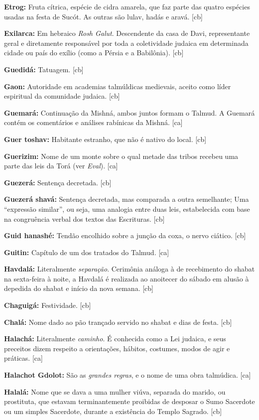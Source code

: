 \textbf{Etrog:} Fruta cítrica, espécie de cidra amarela, que faz parte das 
quatro espécies usadas na festa de Sucót. As outras são lulav, hadás e aravá. [cb]

\textbf{Exilarca:} Em hebraico \emph{Rosh Galut}. Descendente da casa de Davi, 
representante geral e diretamente responsável por toda a coletividade
judaica em determinada cidade ou país do exílio (como a Pérsia e a Babilônia). [cb]

\textbf{Guedidá:} Tatuagem. [cb]

\textbf{Gaon:} Autoridade em academias talmúldicas medievais, aceito como líder espiritual da comunidade judaica. [cb]

\textbf{Guemará:} Continuação da Mishná, ambos juntos formam o Talmud. A Guemará 
contém os comentários e análises rabínicas da Mishná. [ca]

\textbf{Guer toshav:} Habitante estranho, que não é nativo do local. [cb]

\textbf{Guerizim:} Nome de um monte sobre o qual metade das tribos recebeu uma 
parte das leis da Torá (ver \emph{Eval}). [ca]

\textbf{Guezerá:} Sentença decretada. [cb]

\textbf{Guezerá shavá:} Sentença decretada, mas comparada a outra semelhante; Uma ``expressão similar'', ou seja, uma analogia entre duas leis,
  estabelecida com base na congruência verbal dos textos das
  Escrituras. [cb]

\textbf{Guid hanashé:} Tendão encolhido sobre a junção da coxa, o nervo ciático. [cb]

\textbf{Guitin:} Capítulo de um dos tratados do Talmud. [ca]

\textbf{Havdalá:} Literalmente \emph{separação}. Cerimônia análoga à 
de recebimento do shabat na sexta-feira à noite, a Havdalá é 
realizada ao anoitecer do sábado em alusão à depedida do shabat 
e início da nova semana. [cb]

\textbf{Chaguigá:} Festividade. [cb]

\textbf{Chalá:} Nome dado ao pão trançado servido no shabat e dias de festa. [cb]

\textbf{Halachá:} Literalmente \emph{caminho}. É conhecida como a 
Lei judaica, e seus preceitos dizem respeito a orientações, hábitos, 
costumes, modos de agir e práticas. [ca]

\textbf{Halachot Gdolot:} São as \emph{grandes regras}, e o nome de 
uma obra talmúdica. [ca]

\textbf{Halalá:} Nome que se dava a uma mulher viúva, separada do
marido, ou prostituta, que estavam terminantemente proibidas de desposar
o Sumo Sacerdote ou um simples Sacerdote, durante a existência do Templo
Sagrado. [cb]

